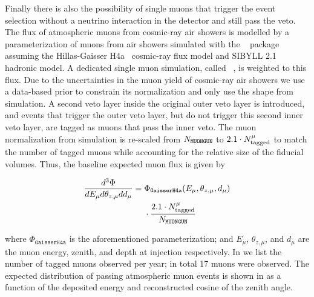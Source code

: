 Finally there is also the possibility of single muons that trigger the event selection without a neutrino interaction in the detector and still pass the veto.
The flux of atmospheric muons from cosmic-ray air showers is modelled by a parameterization of muons from air showers simulated with the \CORSIKA~\cite{Heck:1998vt} package assuming the Hillas-Gaisser H4a~\cite{Gaisser:2013bla} cosmic-ray flux model and SIBYLL 2.1~\cite{Ahn:2009wx} hadronic model.
A dedicated single muon simulation, called \MUONGUN~\cite{jvsthesis}, is weighted to this flux. 
Due to the uncertainties in the muon yield of cosmic-ray air showers we use a data-based prior to constrain its normalization and only use the shape from simulation.
A second veto layer inside the original outer veto layer is introduced, and events that trigger the outer veto layer, but do not trigger this second inner veto layer, are tagged as muons that pass the inner veto.
The muon normalization from simulation is re-scaled from $N_{\texttt{MUONGUN}}$ to $2.1\cdot N^\mu_\textmd{tagged}$ to match the number of tagged muons while accounting for the relative size of the fiducial volumes.
Thus, the baseline expected muon flux is given by
\begin{linenomath*}
	\begin{align}
	\frac{d^3\Phi}{d E_\mu d \theta_{z,\mu} d d_\mu} ={}& \Phi_\texttt{GaisserH4a}(E_\mu, \theta_{z,\mu},d_\mu)\\* & \cdot \frac{2.1 \cdot N^\mu_\textmd{tagged}}{N_{\texttt{MUONGUN}}}
	\end{align}
	\label{eq:muon_scaling}
\end{linenomath*}
where $\Phi_\texttt{GaisserH4a}$ is the aforementioned parameterization; and $E_\mu$, $\theta_{z,\mu}$, and $d_\mu$ are the muon energy, zenith, and depth at injection respectively.
In  we list the number of tagged muons observed per year; in total 17 muons were observed.
The expected distribution of passing atmospheric muon events is shown in  as a function of the deposited energy and reconstructed cosine of the zenith angle.

